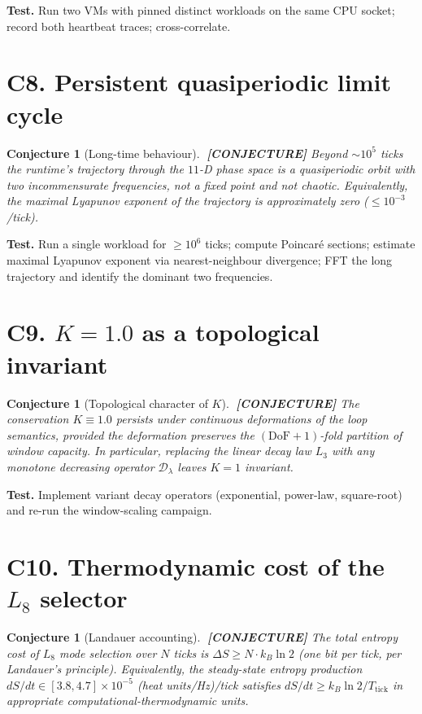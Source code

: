 \documentclass[11pt,letterpaper,openany]{book}
\theoremstyle{definition}
\theoremstyle{plain}
\newtheorem{openconjecture}[definition]{Conjecture}
\newcommand{\conjecture}{\textcolor{red!60!black}{\textbf{[CONJECTURE]}}\xspace}
\newcommand{\Loop}[1]{L_{#1}}
\begin{document}
\noindent\textbf{Test.} Run two VMs with pinned distinct workloads
on the same CPU socket; record both heartbeat traces; cross-correlate.

\section*{C8. Persistent quasiperiodic limit cycle}

\begin{openconjecture}[Long-time behaviour]\label{conj:quasiperiodic}
$\;$\conjecture
Beyond $\sim 10^5$ ticks the runtime's trajectory through the $11$-D
phase space is a quasiperiodic orbit with two incommensurate
frequencies, not a fixed point and not chaotic. Equivalently, the
maximal Lyapunov exponent of the trajectory is approximately zero
($\le 10^{-3}$/tick).
\end{openconjecture}

\noindent\textbf{Test.} Run a single workload for $\ge 10^6$ ticks;
compute Poincar\'e sections; estimate maximal Lyapunov exponent via
nearest-neighbour divergence; FFT the long trajectory and identify
the dominant two frequencies.

\section*{C9. $K = 1.0$ as a topological invariant}

\begin{openconjecture}[Topological character of $K$]\label{conj:topological}
$\;$\conjecture
The conservation $K \equiv 1.0$ persists under continuous deformations of
the loop semantics, provided the deformation preserves the
$(\mathrm{DoF}+1)$-fold partition of window capacity. In particular,
replacing the linear decay law $\Loop{3}$ with any monotone decreasing
operator $\mathcal{D}_\lambda$ leaves $K = 1$ invariant.
\end{openconjecture}

\noindent\textbf{Test.} Implement variant decay operators (exponential,
power-law, square-root) and re-run the window-scaling campaign.

\section*{C10. Thermodynamic cost of the $\Loop{8}$ selector}

\begin{openconjecture}[Landauer accounting]\label{conj:landauer}
$\;$\conjecture
The total entropy cost of $\Loop{8}$ mode selection over $N$ ticks is
$\Delta S \ge N\cdot k_B\ln 2$ (one bit per tick, per Landauer's principle).
Equivalently, the steady-state entropy production
$dS/dt \in [3.8, 4.7]\times 10^{-5}$ (heat units/Hz)/tick
satisfies $dS/dt \ge k_B\ln 2 / T_{\mathrm{tick}}$ in appropriate
computational-thermodynamic units.
\end{openconjecture}
\end{document}
